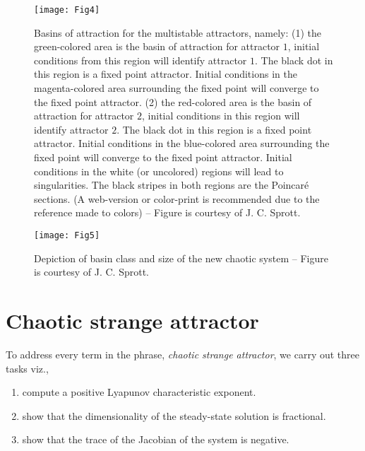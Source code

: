 \documentclass[final,5p,times,twocolumn]{elsarticle}
\begin{document}
\begin{figure}[htbp]	
	\texttt{[image: Fig4]}
	\caption{Basins of attraction for the multistable attractors, namely: (1) the green-colored area is the basin of attraction for attractor $1$, initial conditions from this region will identify attractor $1$. The black dot in this region is a fixed point attractor. Initial conditions in the magenta-colored area surrounding the fixed point will converge to the fixed point attractor. (2) the red-colored area is the basin of attraction for attractor $2$, initial conditions in this region will identify attractor $2$. The black dot in this region is a fixed point attractor. Initial conditions in the blue-colored area surrounding the fixed point will converge to the fixed point attractor. Initial conditions in the white (or uncolored) regions will lead to singularities. The black stripes in both regions are the Poincar\'{e} sections. (A web-version or color-print is recommended due to the reference made to colors) -- Figure is courtesy of J. C. Sprott.}
	\label{basinxy}
\end{figure}
\begin{figure}[htbp]
	\texttt{[image: Fig5]}
	\caption{Depiction of basin class and size of the new chaotic system -- Figure is courtesy of J. C. Sprott.}
	\label{basin_size_n_class}
\end{figure}

\section{Chaotic strange attractor}
To address every term in the phrase, \textit{chaotic strange attractor}, we carry out three tasks viz.,
\begin{enumerate}
	\item compute a positive Lyapunov characteristic exponent.
	\item show that the dimensionality of the steady-state solution is fractional.
	\item show that the trace of the Jacobian of the system is negative. 
\end{enumerate}
\end{document}
